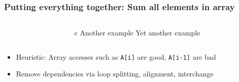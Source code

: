 \documentclass[handout]{beamer}
\begin{document}
\begin{frame}[fragile]
  \frametitle{Putting everything together: Sum all elements in array}
  \begin{columns}[t]%
    \begin{column}{0.65\textwidth}
    \end{column}
    \pause
    \begin{column}{0.4\textwidth}
      \begin{ccode}[]
        {c}
        Another example
        Yet another example
      \end{ccode}
    \end{column}
  \end{columns}
  \pause
  \begin{itemize}
  \item Heuristic: Array accesses such as \texttt{A[i]} are good, \texttt{A[i-1]} are bad
  \item Remove dependencies via loop splitting, alignment, interchange
  \end{itemize}
\end{frame}
\end{document}
